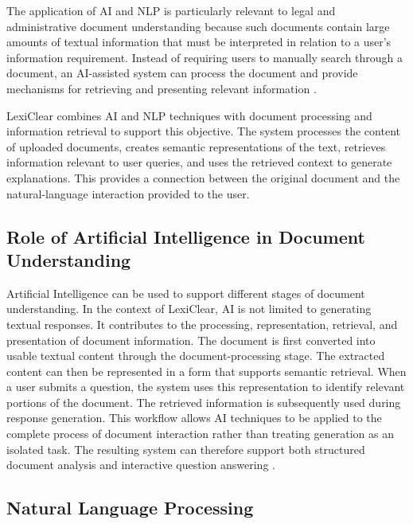 \documentclass[12pt,a4paper,oneside]{report}
\begin{document}
The application of AI and NLP is particularly relevant to legal and
administrative document understanding because such documents contain large
amounts of textual information that must be interpreted in relation to a
user's information requirement. Instead of requiring users to manually
search through a document, an AI-assisted system can process the document
and provide mechanisms for retrieving and presenting relevant information \cite{mahoney2019,bommarito2018lexnlp}.

LexiClear combines AI and NLP techniques with document processing and
information retrieval to support this objective. The system processes the
content of uploaded documents, creates semantic representations of the
text,
retrieves information relevant to user queries, and uses the retrieved
context to generate explanations. This provides a connection between the
original document and the natural-language interaction provided to the user.

\subsection{Role of Artificial Intelligence in Document Understanding}

Artificial Intelligence can be used to support different stages of document
understanding. In the context of LexiClear, AI is not limited to generating
textual responses. It contributes to the processing, representation,
retrieval, and presentation of document information. The document is first converted into usable textual content through the
document-processing stage. The extracted content can then be represented in
a form that supports semantic retrieval. When a user submits a question, the
system uses this representation to identify relevant portions of the
document.
The retrieved information is subsequently used during response generation. This workflow allows AI techniques to be applied to the complete process of
document interaction rather than treating generation as an isolated task.
The resulting system can therefore support both structured document analysis
and interactive question answering \cite{mahoney2019,pramanik2025}.

\subsection{Natural Language Processing}
\end{document}
